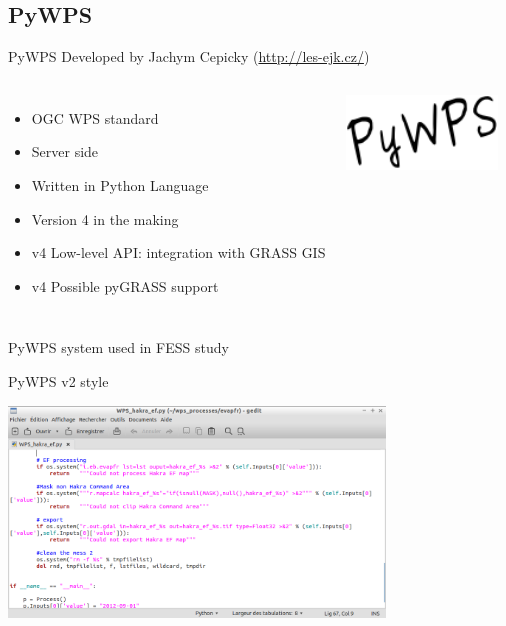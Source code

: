 \documentclass[xcolor=dvipsnames,beamer]{beamer} %
\begin{document}
\subsection{PyWPS}
\begin{frame}[fragile]{PyWPS}
 Developed by Jachym Cepicky (\href{http://les-ejk.cz/}{http://les-ejk.cz/})
\begin{columns}
 \begin{itemize}
  \item OGC WPS standard
  \item Server side
  \item Written in Python Language
  \item Version 4 in the making
  \item v4 Low-level API: integration with GRASS GIS
  \item v4 Possible pyGRASS support
 \end{itemize}

\begin{flushright}
  \includegraphics[width=4cm]{pywps}
\end{flushright}
\end{columns}
\hspace{10mm}
\end{frame}

\begin{frame}[fragile]{PyWPS system used in FESS study}

\begin{block}{PyWPS v2 style}
\begin{center}
\includegraphics[width=10cm]{pywps_hakra}
\end{center}
\end{block}
\end{frame}
\end{document}
